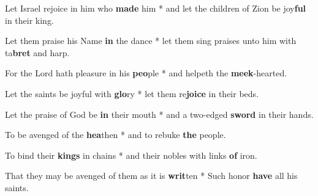 \begin{multicols}{2}
	Let Israel rejoice in him who \textbf{made} him * and let the children of Zion be joy\textbf{ful} in their king.
	
	Let them praise his Name \textbf{in} the dance * let them sing praises unto him with ta\textbf{bret} and harp.
	
	For the Lord hath pleasure in his \textbf{peo}ple * and helpeth the \textbf{meek}-hearted.
	
	Let the saints be joyful with \textbf{glo}ry * let them re\textbf{joice} in their beds.
	
	Let the praise of God be \textbf{in} their mouth * and a two-edged \textbf{sword} in their hands.
	
	To be avenged of the \textbf{hea}then * and to rebuke \textbf{the} people.
	
	To bind their \textbf{kings} in chains * and their nobles with links \textbf{of} iron.
	
	That they may be avenged of them as it is \textbf{writ}ten * Such honor \textbf{have} all his saints.
\end{multicols}